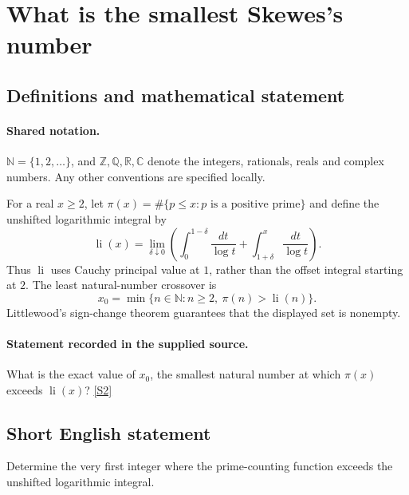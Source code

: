 \documentclass[11pt]{article}
\newcommand{\sref}[2]{\hyperlink{source:#1:#2}{[S#2]}}
\begin{document}
\section{What is the smallest Skewes's number}\label{statement}

\subsection{Definitions and mathematical statement}

\paragraph{Shared notation.}$\mathbb N=\{1,2,\ldots\}$, and $\mathbb Z,\mathbb Q,\mathbb R,\mathbb C$ denote the integers, rationals, reals and complex numbers. Any other conventions are specified locally.


For a real $x\ge2$, let $\pi(x)=\#\{p\le x:p\text{ is a positive prime}\}$ and define the unshifted logarithmic integral by
\[\operatorname{li}(x)=\lim_{\delta\downarrow0}\left(\int_0^{1-\delta}\frac{dt}{\log t}+\int_{1+\delta}^{x}\frac{dt}{\log t}\right).\]
Thus $\operatorname{li}$ uses Cauchy principal value at $1$, rather than the offset integral starting at $2$. The least natural-number crossover is
\[x_0=\min\{n\in\mathbb N:n\ge2,\ \pi(n)>\operatorname{li}(n)\}.\]
Littlewood's sign-change theorem guarantees that the displayed set is nonempty.
\paragraph{Statement recorded in the supplied source.}
What is the exact value of $x_0$, the smallest natural number at which $\pi(x)$ exceeds $\operatorname{li}(x)$? \sref{statement}{2}
\subsection{Short English statement}
Determine the very first integer where the prime-counting function exceeds the unshifted logarithmic integral.
\end{document}
